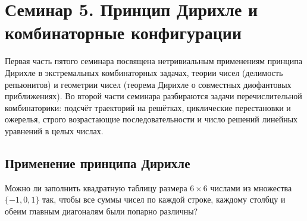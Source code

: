 \section{Семинар 5. Принцип Дирихле и комбинаторные конфигурации}

\begin{remark}
    Первая часть пятого семинара посвящена нетривиальным применениям 
    принципа Дирихле в экстремальных комбинаторных задачах, теории чисел 
    (делимость репьюнитов) и геометрии чисел (теорема Дирихле о совместных 
    диофантовых приближениях). Во второй части семинара разбираются задачи 
    перечислительной комбинаторики: подсчёт траекторий на решётках, 
    циклические перестановки и ожерелья, строго возрастающие 
    последовательности и число решений линейных уравнений в целых числах.
\end{remark}

\subsection{Применение принципа Дирихле}

\begin{problem}
    Можно ли заполнить квадратную таблицу размера $6 \times 6$ числами из 
    множества $\{-1, 0, 1\}$ так, чтобы все суммы чисел по каждой строке, 
    каждому столбцу и обеим главным диагоналям были попарно различны?
\end{problem}

